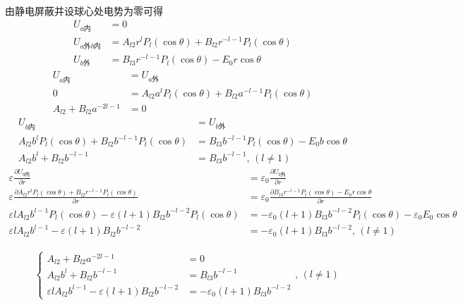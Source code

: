 由静电屏蔽并设球心处电势为零可得
\begin{align*}
        U_{a\text{内}}&
=0\\
U_{a\text{外}b\text{内}}&=
A_{l2} r^l
P_{l}(\cos\theta)
+B_{l2} r^{-l-1}
P_{l}(\cos\theta)\\
U_{b\text{外}}&=
B_{l3} r^{-l-1}
P_{l}(\cos\theta)-E_0r\cos\theta
\end{align*}
\begin{align*}
U_{a\text{内}}&=U_{a\text{外}}\\
0&=A_{l2}a^l
P_{l}(\cos\theta)
+B_{l2}a^{-l-1}
P_{l}(\cos\theta)\\
A_{l2}+B_{l2}a^{-2l-1}&=0
\end{align*}
\begin{align*}
U_{b\text{内}}&=U_{b\text{外}}\\
A_{l2}b^l
P_{l}(\cos\theta)
+B_{l2}b^{-l-1}
P_{l}(\cos\theta)&=
B_{l3}b^{-l-1}
P_{l}(\cos\theta)-E_0b\cos\theta\\
A_{l2}b^l
+B_{l2}b^{-l-1}&=
B_{l3}b^{-l-1},\,(l\neq  1)
\end{align*}
\begin{align*}
\varepsilon\frac{\partial U_{b\text{内}}}{\partial r}&=\varepsilon_0\frac{\partial U_{b\text{外}}}{\partial r}\\
\varepsilon\frac{\partial A_{l2} r^l
P_{l}(\cos\theta)
+B_{l2} r^{-l-1}
P_{l}(\cos\theta)}{\partial r}&=\varepsilon_0\frac{\partial 
B_{l3} r^{-l-1}
P_{l}(\cos\theta)-E_0r\cos\theta}{\partial r}\\
\varepsilon lA_{l2} b^{l-1}
P_{l}(\cos\theta)
-\varepsilon (l+1)B_{l2} b^{-l-2}
P_{l}(\cos\theta)&=-\varepsilon_0(l+1)
B_{l3} b^{-l-2}
P_{l}(\cos\theta)-\varepsilon_0E_0\cos\theta\\
\varepsilon lA_{l2} b^{l-1}
-\varepsilon (l+1)B_{l2} b^{-l-2}&=-\varepsilon_0(l+1)
B_{l3} b^{-l-2},\,(l\neq  1)
\end{align*}

\begin{align*}
    &\left\{\begin{aligned}
        A_{l2}+B_{l2}a^{-2l-1}&=0\\
A_{l2}b^l
+B_{l2}b^{-l-1}&=
B_{l3}b^{-l-1}\\
\varepsilon lA_{l2} b^{l-1}
-\varepsilon (l+1)B_{l2} b^{-l-2}&=-\varepsilon_0(l+1)
B_{l3} b^{-l-2}
\end{aligned}\right.,\,(l\neq  1)
\end{align*}

